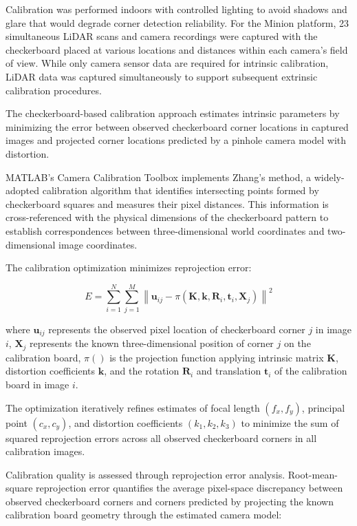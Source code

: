 Calibration was performed indoors with controlled lighting to avoid shadows and glare that would degrade corner detection reliability.
For the Minion platform, 23 simultaneous LiDAR scans and camera recordings were captured with the checkerboard placed at various locations and distances within each camera's field of view.
While only camera sensor data are required for intrinsic calibration, LiDAR data was captured simultaneously to support subsequent extrinsic calibration procedures.


The checkerboard-based calibration approach estimates intrinsic parameters by minimizing the error between observed checkerboard corner locations in captured images and projected corner locations predicted by a pinhole camera model with distortion.

MATLAB's Camera Calibration Toolbox implements Zhang's method, a widely-adopted calibration algorithm that identifies intersecting points formed by checkerboard squares and measures their pixel distances.
This information is cross-referenced with the physical dimensions of the checkerboard pattern to establish correspondences between three-dimensional world coordinates and two-dimensional image coordinates.

The calibration optimization minimizes reprojection error:

\begin{equation}
    E = \sum_{i=1}^{N} \sum_{j=1}^{M} \left\| \mathbf{u}_{ij} - \pi(\mathbf{K}, \mathbf{k}, \mathbf{R}_i, \mathbf{t}_i, \mathbf{X}_j) \right\|^2
\end{equation}


where $\mathbf{u}_{ij}$ represents the observed pixel location of checkerboard corner $j$ in image $i$, $\mathbf{X}_j$ represents the known three-dimensional position of corner $j$ on the calibration board, $\pi()$ is the projection function applying intrinsic matrix $\mathbf{K}$, distortion coefficients $\mathbf{k}$, and the rotation $\mathbf{R}_i$ and translation $\mathbf{t}_i$ of the calibration board in image $i$.

The optimization iteratively refines estimates of focal length $(f_x, f_y)$, principal point $(c_x, c_y)$, and distortion coefficients $(k_1, k_2, k_3)$ to minimize the sum of squared reprojection errors across all observed checkerboard corners in all calibration images.


Calibration quality is assessed through reprojection error analysis.
Root-mean-square reprojection error quantifies the average pixel-space discrepancy between observed checkerboard corners and corners predicted by projecting the known calibration board geometry through the estimated camera model:

